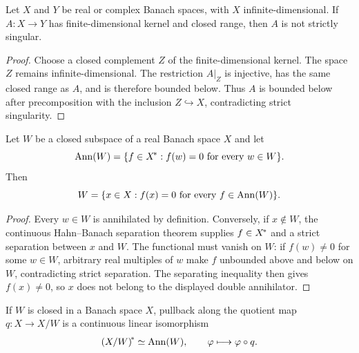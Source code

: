 \begin{lemma}
\label{lem:upper-semi-not-strictly-singular}
Let $X$ and $Y$ be real or complex Banach spaces, with $X$ infinite-dimensional.  If
$A:X\to Y$ has finite-dimensional kernel and closed range, then $A$ is not strictly singular.
\leanok
\end{lemma}

\begin{proof}
Choose a closed complement $Z$ of the finite-dimensional kernel.  The space $Z$ remains
infinite-dimensional.  The restriction $A|_Z$ is injective, has the same closed range as $A$, and
is therefore bounded below.  Thus $A$ is bounded below after precomposition with the inclusion
$Z\hookrightarrow X$, contradicting strict singularity.
\end{proof}

\begin{lemma}\label{lem:double-annihilator}
Let $W$ be a closed subspace of a real Banach space $X$ and let
\[
  \operatorname{Ann}(W)=\{f\in{X}^{\!*}:f(w)=0\text{ for every }w\in W\}.
\]
Then
\[
  W=\{x\in X:f(x)=0\text{ for every }f\in\operatorname{Ann}(W)\}.
\]
\leanok
\end{lemma}

\begin{proof}
Every $w\in W$ is annihilated by definition. Conversely, if $x\notin W$, the continuous
Hahn--Banach separation theorem supplies $f\in{X}^{\!*}$ and a strict separation between $x$
and $W$. The functional must vanish on $W$: if $f(w)\ne0$ for some $w\in W$, arbitrary real
multiples of $w$ make $f$ unbounded above and below on $W$, contradicting strict separation.
The separating inequality then gives $f(x)\ne0$, so $x$ does not belong to the displayed double
annihilator.
\end{proof}

\begin{lemma}\label{lem:quotient-dual}
If $W$ is closed in a Banach space $X$, pullback along the quotient map $q:X\to X/W$ is a
continuous linear isomorphism
\[
  {(X/W)}^{\!*}\simeq\operatorname{Ann}(W),
  \qquad \varphi\longmapsto\varphi\circ q.
\]
\leanok
\end{lemma}

